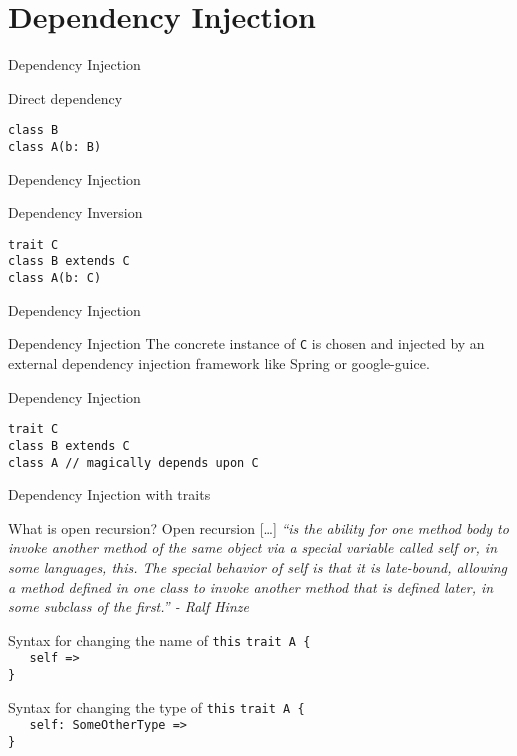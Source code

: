 \section{Dependency Injection}
\begin{frame}[fragile]{Dependency Injection}
\begin{exampleblock}{Direct dependency}
\begin{lstlisting}
class B
class A(b: B)
\end{lstlisting}
\end{exampleblock}
\end{frame}

\begin{frame}[fragile]{Dependency Injection}
\begin{exampleblock}{Dependency Inversion}
\begin{lstlisting}
trait C
class B extends C
class A(b: C)
\end{lstlisting}
\end{exampleblock}
\end{frame}

\begin{frame}[fragile]{Dependency Injection}
\begin{block}{Dependency Injection}
The concrete instance of \lstinline!C! is chosen and injected by an external
dependency injection framework like Spring or google-guice.
\end{block}
\begin{exampleblock}{Dependency Injection}
\begin{lstlisting}
trait C
class B extends C
class A // magically depends upon C
\end{lstlisting}
\end{exampleblock}
\end{frame}

\begin{frame}[fragile]{Dependency Injection with traits}
\begin{block}{What is open recursion?}
Open recursion [\ldots] \emph{``is the ability for one method body to invoke
another method of the same object via a special variable called self or, in some
languages, this. The special behavior of self is that it is late-bound, allowing
a method defined in one class to invoke another method that is defined later, in
some subclass of the first.'' - Ralf Hinze}
\end{block}
\pause
\begin{exampleblock}{Syntax for changing the name of \lstinline!this!}
\lstinline!trait A {!\\
\lstinline!   self =>!\\
\lstinline!}!
\end{exampleblock}
\pause
\begin{exampleblock}{Syntax for changing the type of \lstinline!this!}
\lstinline!trait A {!\\
\lstinline!   self: SomeOtherType =>!\\
\lstinline!}!
\end{exampleblock}
\end{frame}

